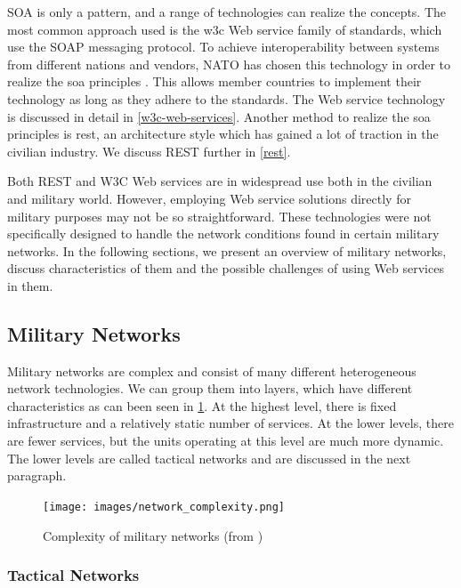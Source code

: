 SOA is only a pattern, and a range of technologies can realize the concepts. The
most common approach used is the \gls{w3c} Web service family of standards,
which use the SOAP messaging protocol. To achieve interoperability between
systems from different nations and vendors, NATO has chosen this technology in
order to realize the \gls{soa} principles \cite{soa-baseline}. This allows
member countries to implement their technology as long as they adhere to the
standards. The Web service technology is discussed in detail in
\cref{w3c-web-services}. Another method to realize the \gls{soa} principles is
\gls{rest}, an architecture style which has gained a lot of traction in the
civilian industry. We discuss REST further in \cref{rest}.

Both REST and W3C Web services are in widespread use both in the civilian and
military world. However, employing Web service solutions directly for military
purposes may not be so straightforward. These technologies were not specifically
designed to handle the network conditions found in certain military networks. In
the following sections, we present an overview of military networks, discuss
characteristics of them and the possible challenges of using Web services in
them.

\subsection{Military Networks}

Military networks are complex and consist of many different heterogeneous
network technologies. We can group them into layers, which have different
characteristics as can been seen in \cref{figure:military-networks}. At the
highest level, there is fixed infrastructure and a relatively static number of
services. At the lower levels, there are fewer services, but the units operating
at this level are much more dynamic. The lower levels are called tactical
networks and are discussed in the next paragraph.

\begin{figure}[h]
\texttt{[image: images/network\_complexity.png]}
\caption{Complexity of military networks (from \cite{pervasive-web})}
\label{figure:military-networks}
\end{figure}

\subsubsection{Tactical Networks}

